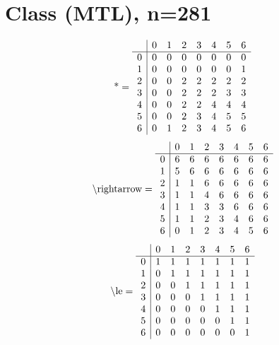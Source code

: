 \documentclass[11pt]{article}
\begin{document}
\section{Class (MTL), n=281}
\[\text{*} = 
\begin{array}{r | r r r r r r r}
 & 0 & 1 & 2 & 3 & 4 & 5 & 6 \\ \hline
0 & 0 & 0 & 0 & 0 & 0 & 0 & 0 \\
1 & 0 & 0 & 0 & 0 & 0 & 0 & 1 \\
2 & 0 & 0 & 2 & 2 & 2 & 2 & 2 \\
3 & 0 & 0 & 2 & 2 & 2 & 3 & 3 \\
4 & 0 & 0 & 2 & 2 & 4 & 4 & 4 \\
5 & 0 & 0 & 2 & 3 & 4 & 5 & 5 \\
6 & 0 & 1 & 2 & 3 & 4 & 5 & 6 \\
\end{array}
\]
\[\text{\textbackslash rightarrow} = 
\begin{array}{r | r r r r r r r}
 & 0 & 1 & 2 & 3 & 4 & 5 & 6 \\ \hline
0 & 6 & 6 & 6 & 6 & 6 & 6 & 6 \\
1 & 5 & 6 & 6 & 6 & 6 & 6 & 6 \\
2 & 1 & 1 & 6 & 6 & 6 & 6 & 6 \\
3 & 1 & 1 & 4 & 6 & 6 & 6 & 6 \\
4 & 1 & 1 & 3 & 3 & 6 & 6 & 6 \\
5 & 1 & 1 & 2 & 3 & 4 & 6 & 6 \\
6 & 0 & 1 & 2 & 3 & 4 & 5 & 6 \\
\end{array}
\]
\[\text{\textbackslash le} = 
\begin{array}{r | r r r r r r r}
 & 0 & 1 & 2 & 3 & 4 & 5 & 6 \\ \hline
0 & 1 & 1 & 1 & 1 & 1 & 1 & 1 \\
1 & 0 & 1 & 1 & 1 & 1 & 1 & 1 \\
2 & 0 & 0 & 1 & 1 & 1 & 1 & 1 \\
3 & 0 & 0 & 0 & 1 & 1 & 1 & 1 \\
4 & 0 & 0 & 0 & 0 & 1 & 1 & 1 \\
5 & 0 & 0 & 0 & 0 & 0 & 1 & 1 \\
6 & 0 & 0 & 0 & 0 & 0 & 0 & 1 \\
\end{array}
\]
\end{document}
